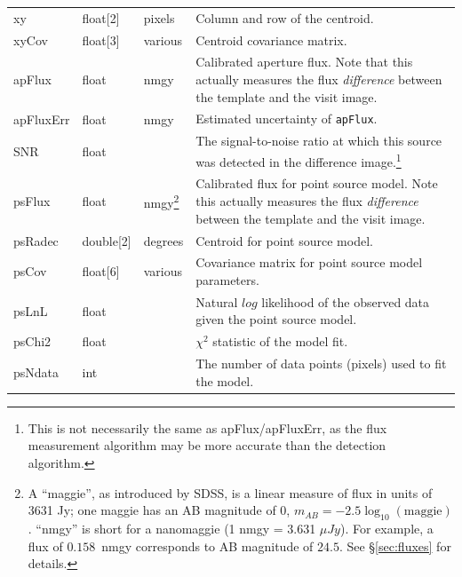 \documentclass[12pt]{article}
\begin{document}
\begin{center}
\begin{longtable}{p{3cm}p{2cm}p{2cm}p{5cm}}
xy & float[2] & pixels & Column and row of the centroid. \\

xyCov & float[3] & various & Centroid covariance matrix. \\

apFlux & float & nmgy & Calibrated aperture flux. Note that this actually measures
the flux \emph{difference} between the template and the visit image. \\

apFluxErr & float & nmgy &  Estimated uncertainty of \texttt{apFlux}. \\

SNR & float & ~ & The signal-to-noise ratio at which this source was detected in the difference image.\footnote{This is not necessarily the same as apFlux/apFluxErr, as the flux measurement algorithm may be more accurate than the detection algorithm.} \\

psFlux & float & nmgy\footnote{A ``maggie'', as introduced by SDSS, is a linear measure of flux in units of 3631 Jy; one maggie has an AB magnitude of 0, $m_{AB}=-2.5\log_{10}(\mathrm{maggie})$. ``nmgy'' is short for a nanomaggie (1 nmgy = 3.631 $\mu Jy$). For example, a flux of $0.158$~nmgy corresponds to AB magnitude of $24.5$. See \S \ref{sec:fluxes} for details.} & Calibrated flux for point source model. Note this actually measures the flux \emph{difference} between the template and the visit image. \\

psRadec & double[2] & degrees & Centroid for point source model. \\

psCov & float[6] & various & Covariance matrix for point source model parameters. \\

psLnL & float & ~ & Natural $log$ likelihood of the observed data given the point source model. \\

psChi2 & float & ~ & $\chi^2$ statistic of the model fit. \\

psNdata & int & ~ & The number of data points (pixels) used to fit the model. \\


\end{longtable}
\end{center}
\end{document}
